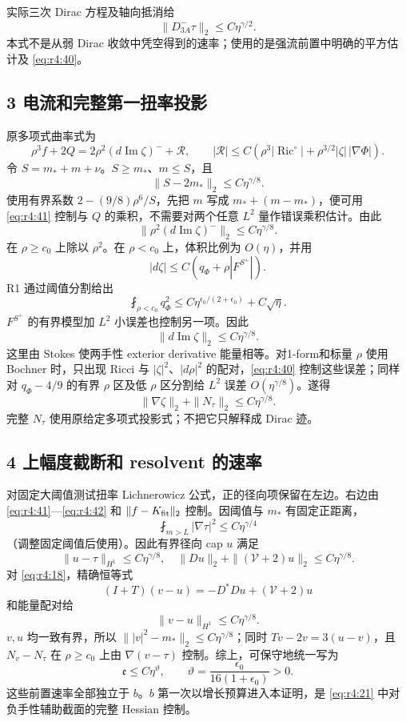 \documentclass[UTF8,11pt,openany,oneside,fontset=none]{ctexbook}
\begin{document}
实际三次 Dirac 方程及轴向抵消给 \[
\|D^-_{3A}\tau\|_2\le C\eta^{\gamma/2}.
\tag{4.42}\label{eq:r4:42}
\] 本式不是从弱 Dirac 收敛中凭空得到的速率；使用的是强流前置中明确的平方估计及 \eqref{eq:r4:40}。

\subsection{3 电流和完整第一扭率投影}\label{ch4:ux7535ux6d41ux548cux5b8cux6574ux7b2cux4e00ux626dux7387ux6295ux5f71}

原多项式曲率式为 \[
\rho^3f+2Q=2\rho^2(d\operatorname{Im}\zeta)^-+\mathcal R,
\qquad
|\mathcal R|\le C\left(\rho^3|\operatorname{Ric}^{\circ}|
+\rho^{3/2}|\zeta|\,|\nabla\Phi|\right).
\] 令 \(S=m_*+m+\nu\)。\(S\ge m_*\)、\(m\le S\)，且 \[
\|S-2m_*\|_2\le C\eta^{\gamma/8}.
\] 使用有界系数 \(2-(9/8)\rho^6/S\)，先把 \(m\) 写成 \(m_*+(m-m_*)\)，便可用 \eqref{eq:r4:41} 控制与 \(Q\) 的乘积，不需要对两个任意 \(L^2\) 量作错误乘积估计。由此 \[
\|\rho^2(d\operatorname{Im}\zeta)^-\|_2\le C\eta^{\gamma/8}.
\] 在 \(\rho\ge c_0\) 上除以 \(\rho^2\)。在 \(\rho<c_0\) 上，体积比例为 \(O(\eta)\)，并用 \[
|d\zeta|\le C\left(q_\Phi+\rho|F^{S^+}|\right).
\] R1 通过阈值分割给出 \[
\fint_{\rho<c_0}q_\Phi^2
\le C\eta^{\epsilon_0/(2+\epsilon_0)}+C\sqrt\eta.
\] \(F^{S^+}\) 的有界模型加 \(L^2\) 小误差也控制另一项。因此 \[
\|d\operatorname{Im}\zeta\|_2\le C\eta^{\gamma/8}.
\] 这里由 Stokes 使两手性 exterior derivative 能量相等。对1-form和标量 \(\rho\) 使用 Bochner 时，只出现 Ricci 与 \(|\zeta|^2\)、\(|d\rho|^2\) 的配对，\eqref{eq:r4:40} 控制这些误差；同样对 \(q_\Phi-4/9\) 的有界 \(\rho\) 区及低 \(\rho\) 区分割给 \(L^2\) 误差 \(O(\eta^{\gamma/8})\)。遂得 \[
\boxed{\|\nabla\zeta\|_2+\|N_\tau\|_2\le C\eta^{\gamma/8}.}
\tag{4.43}\label{eq:r4:43}
\] 完整 \(N_\tau\) 使用原给定多项式投影式；不把它只解释成 Dirac 迹。

\subsection{4 上幅度截断和 resolvent 的速率}\label{ch4:ux4e0aux5e45ux5ea6ux622aux65adux548c-resolvent-ux7684ux901fux7387}

对固定大阈值测试扭率 Lichnerowicz 公式，正的径向项保留在左边。右边由 \eqref{eq:r4:41}---\eqref{eq:r4:42} 和 \(\|f-K_{\rm fit}\|_2\) 控制。因阈值与 \(m_*\) 有固定正距离， \[
\fint_{m>L}|\nabla\tau|^2\le C\eta^{\gamma/4}
\] （调整固定阈值后使用）。因此有界径向 cap \(u\) 满足 \[
\|u-\tau\|_{H^1}\le C\eta^{\gamma/8},
\quad \|Du\|_2+\|(\mathcal V+2)u\|_2\le C\eta^{\gamma/8}.
\] 对 \eqref{eq:r4:18}，精确恒等式 \[
(I+T)(v-u)=-D^*Du+(\mathcal V+2)u
\] 和能量配对给 \[
\|v-u\|_{H^1}\le C\eta^{\gamma/8}.
\] \(v,u\) 均一致有界，所以 \(\||v|^2-m_*\|_2\le C\eta^{\gamma/8}\)；同时 \(Tv-2v=3(u-v)\)，且 \(N_v-N_\tau\) 在 \(\rho\ge c_0\) 上由 \(\nabla(v-\tau)\) 控制。综上，可保守地统一写为 \[
\boxed{\mathfrak e\le C\eta^\vartheta,\qquad
\vartheta=\frac{\epsilon_0}{16(1+\epsilon_0)}>0.}
\tag{4.44}\label{eq:r4:44}
\] 这些前置速率全部独立于 \(b\)。\(b\) 第一次以增长预算进入本证明，是 \eqref{eq:r4:21} 中对负手性辅助截面的完整 Hessian 控制。
\end{document}
